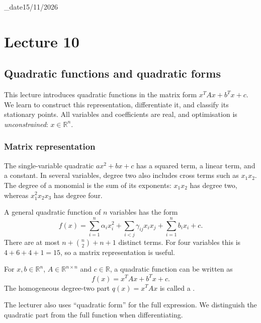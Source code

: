 \lecture_date{15/11/2026}
\chapter{Lecture 10}

\section{Quadratic functions and quadratic forms}\label{sec:lec10-quadratics}
This lecture introduces quadratic functions in the matrix form $x^TAx+b^Tx+c$. We learn to construct this representation, differentiate it, and classify its stationary points. All variables and coefficients are real, and optimisation is \emph{unconstrained}: $x\in\mathbb R^n$.

\subsection{Matrix representation}
The single-variable quadratic $ax^2+bx+c$ has a squared term, a linear term, and a constant. In several variables, degree two also includes cross terms such as $x_1x_2$. The degree of a monomial is the sum of its exponents: $x_1x_2$ has degree two, whereas $x_1^2x_2x_3$ has degree four.

A general quadratic function of $n$ variables has the form
\[
	f(x)=\sum_{i=1}^n\alpha_i x_i^2
	+\sum_{i<j}\gamma_{ij}x_ix_j
	+\sum_{i=1}^n b_ix_i+c.
\]
There are at most $n+\binom n2+n+1$ distinct terms. For four variables this is $4+6+4+1=15$, so a matrix representation is useful.

\begin{definition}
	For $x,b\in\mathbb R^n$, $A\in\mathbb R^{n\times n}$ and $c\in\mathbb R$, a quadratic function can be written as
	\begin{equation}\label{eq:lec10-standard}
		\boxed{f(x)=x^TAx+b^Tx+c.}
	\end{equation}
	The homogeneous degree-two part $q(x)=x^TAx$ is called a .
\end{definition}
The lecturer also uses ``quadratic form'' for the full expression. We distinguish the quadratic part from the full function when differentiating.

